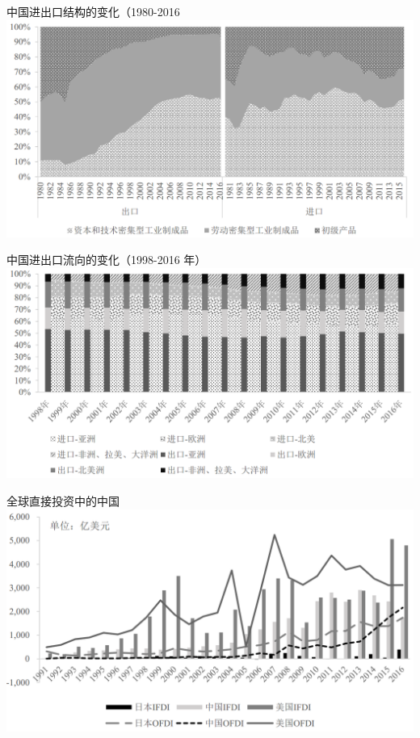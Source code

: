 \documentclass[10pt,hyperref={CJKbookmarks=true},xcolor=dvipsnames,aspectratio=169]{beamer}
\begin{document}
\begin{frame}{中国进出口结构的变化（1980-2016 }
\centering \includegraphics[scale=0.5]{fig/gravity/china2}
\end{frame}

\begin{frame}{中国进出口流向的变化（1998-2016 年）}
\centering \includegraphics[scale=0.55]{fig/gravity/china3}
\end{frame}

\begin{frame}{全球直接投资中的中国}
\centering \includegraphics[scale=0.5]{fig/gravity/china4}
\end{frame}
\end{document}
